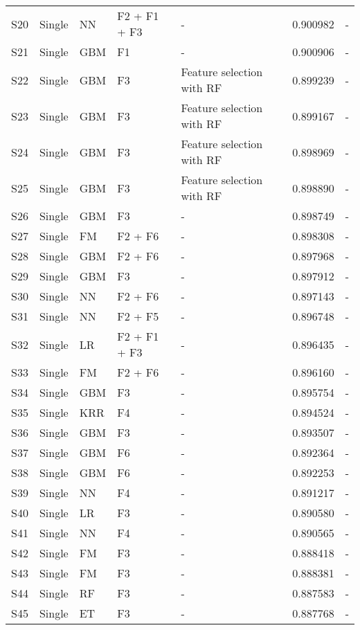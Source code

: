 \begin{table*}
\begin{center}
\begin{minipage}{\textwidth}
{\begin{tabular}{lllllll}
S20 	& Single	& NN		& F2 + F1 + F3 			& - 						& 0.900982	& - \\
S21	& Single 	& GBM		& F1					& - 						& 0.900906	& - \\
S22	& Single	& GBM		& F3					& Feature selection with RF	& 0.899239	& - \\
S23	& Single	& GBM		& F3					& Feature selection with RF	& 0.899167	& - \\
S24	& Single	& GBM		& F3					& Feature selection with RF	& 0.898969	& - \\
S25 	& Single	& GBM		& F3					& Feature selection with RF	& 0.898890	& - \\
S26 	& Single	& GBM		& F3					& - 						& 0.898749	& - \\
S27	& Single	& FM		& F2 + F6				& - 						& 0.898308	& - \\
S28  & Single	& GBM		& F2 + F6				& - 						& 0.897968	& - \\
S29	& Single	& GBM		& F3					& - 						& 0.897912	& - \\
S30	& Single	& NN		& F2 + F6				& - 						& 0.897143	& - \\
S31	& Single	& NN		& F2 + F5				& - 						& 0.896748	& - \\
S32	& Single	& LR			& F2 + F1 + F3			& - 						& 0.896435 	& - \\
S33  & Single	& FM		& F2 + F6				& - 						& 0.896160	& - \\
S34  & Single	& GBM		& F3					& - 						& 0.895754	& - \\
S35	& Single	& KRR		& F4					& - 						& 0.894524	& - \\
S36 	& Single	& GBM		& F3					& - 						& 0.893507	& - \\
S37	& Single	& GBM		& F6					& - 						& 0.892364	& - \\
S38 	& Single	& GBM		& F6					& - 						& 0.892253	& - \\
S39 	& Single	& NN		& F4					& - 						& 0.891217	& - \\
S40	& Single	& LR			& F3					& - 						& 0.890580	& - \\
S41	& Single	& NN		& F4					& - 						& 0.890565	& - \\
S42 	& Single	& FM		& F3					& - 						& 0.888418	& - \\
S43	& Single	& FM		& F3					& - 						& 0.888381	& - \\
S44	& Single	& RF			& F3					& - 						& 0.887583	& - \\
S45	& Single	& ET			& F3					& - 						& 0.887768	& - \\

\end{tabular}}
\end{minipage}
\end{center}
\end{table*}
